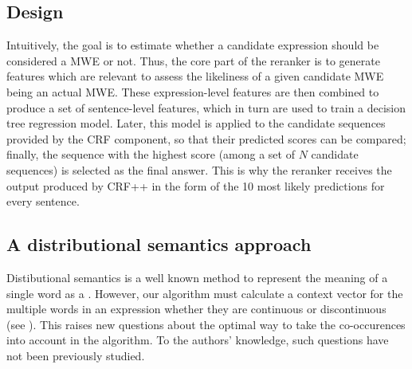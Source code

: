 \documentclass[output=paper
,modfonts
,nonflat]{langsci/langscibook}
\begin{document}
\subsection{Design}

Intuitively, the goal is to estimate whether a candidate expression
should be considered a MWE or not. Thus, the core part of the reranker
is to generate features which are relevant to assess the likeliness of
a given candidate MWE being an actual MWE. These expression-level
features are then combined to produce a set of sentence-level
features, which in turn are used to train a decision tree regression
model. Later, this model is applied to the candidate sequences
provided by the CRF component, so that their predicted scores can be
compared; finally, the sequence with the highest score (among a set of
$N$ candidate sequences) is selected as the final answer. This is why
the reranker receives the output produced by CRF++ in the form of the
10 most likely predictions for every sentence.




\subsection{A distributional semantics approach}
\label{subsec:semanticsApproach}

Distibutional semantics is a well known method to represent the
meaning of a single word as a 
\citep{schutze1998}. However, our algorithm must calculate a context
vector for the multiple words in an expression whether they are
continuous or discontinuous (see ).  This
raises new questions about the optimal way to take the co-occurences into
 account in the algorithm. To the authors’ knowledge, such
questions have not been previously studied.
\end{document}
